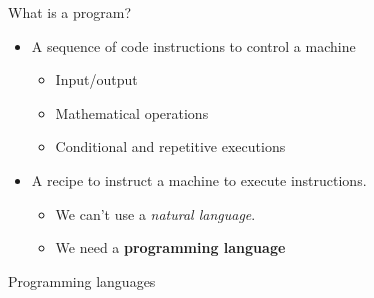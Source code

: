 \documentclass{beamer}%
\begin{document}
\begin{frame}{What is a program?}
	\begin{itemize}
		\item A sequence of code instructions to control a machine
		\begin{itemize}
			\item Input/output
			\item Mathematical operations
			\item Conditional and repetitive executions
		\end{itemize}
		\item A recipe to instruct a machine to execute instructions. 
		\begin{itemize}
			\item We can't use a \emph{natural language}. 
			\item We need a \textbf{programming language}
		\end{itemize}
	\end{itemize}
\end{frame}

\begin{frame}{Programming languages}
	\centering
	{\scriptsize{}}
\end{frame}
\end{document}
